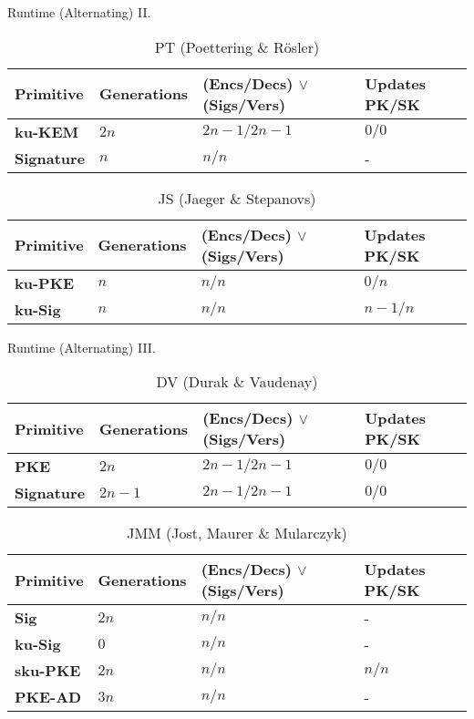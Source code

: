 \documentclass{beamer}
\begin{document}
\begin{frame}{Runtime (Alternating) II.}
  \scriptsize
  \begin{table}
    \caption*{PT (Poettering \& Rösler)}
    \begin{tabular}{ | l | l | l | l |}
      \hline
      Primitive & Generations & (Encs/Decs) $\vee$ (Sigs/Vers) & Updates PK/SK \\ \hline
      \textbf{ku-KEM} & $2n$ & $2n-1/2n-1$ & $0/0$ \\ \hline
      \textbf{Signature} & $n$ & $n/n$ & - \\  
        \hline
    \end{tabular}
  \end{table}
  \begin{table}
    \caption*{JS (Jaeger \& Stepanovs)}
    \begin{tabular}{ | l | l | l | l |}
    \hline
    Primitive & Generations & (Encs/Decs) $\vee$ (Sigs/Vers) & Updates PK/SK \\ \hline
    \textbf{ku-PKE} & $n$ & $n/n$ & $0/n$ \\ \hline
    \textbf{ku-Sig} & $n$ & $n/n$ & $n-1/n$ \\  
    \hline
    \end{tabular}
  \end{table}
\end{frame}

\begin{frame}{Runtime (Alternating) III.}
  \scriptsize
  \begin{table}
    \caption*{DV (Durak \& Vaudenay)}
    \begin{tabular}{ | l | l | l | l |}
    \hline
    Primitive & Generations & (Encs/Decs) $\vee$ (Sigs/Vers) & Updates PK/SK \\ \hline
    \textbf{PKE} & $2n$ & $2n-1/2n-1$ & $0/0$ \\ \hline
    \textbf{Signature} & $2n-1$ & $2n-1/2n-1$ & $0/0$ \\  
    \hline
    \end{tabular}
  \end{table}

  \begin{table}
    \caption*{JMM (Jost, Maurer \& Mularczyk)}
    \begin{tabular}{ | l | l | l | l |}
    \hline
    Primitive & Generations & (Encs/Decs) $\vee$ (Sigs/Vers) & Updates PK/SK \\ \hline
    \textbf{Sig} & $2n$ & $n/n$ & - \\ \hline
    \textbf{ku-Sig} & $0$ & $n/n$ & - \\ \hline
    \textbf{sku-PKE} & $2n$ & $n/n$ & $n/n$ \\ \hline
    \textbf{PKE-AD} & $3n$ & $n/n$ & - \\
    \hline
    \end{tabular}
  \end{table}
\end{frame}
\end{document}

